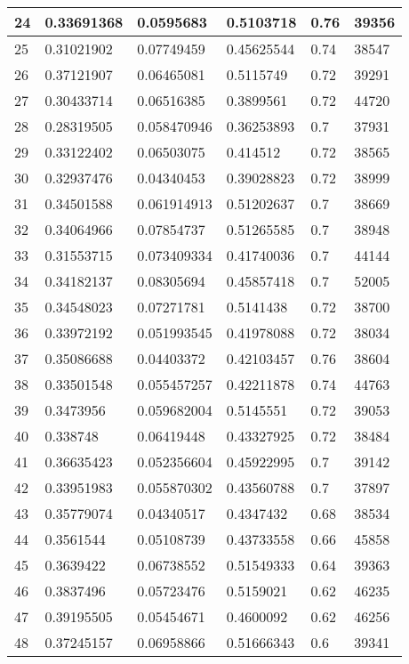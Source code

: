 \begin{longtable}{|l|l|l|l|l|l|}
24 & 0.33691368 & 0.0595683 & 0.5103718 & 0.76 & 39356 \\ \hline 
25 & 0.31021902 & 0.07749459 & 0.45625544 & 0.74 & 38547 \\ \hline 
26 & 0.37121907 & 0.06465081 & 0.5115749 & 0.72 & 39291 \\ \hline 
27 & 0.30433714 & 0.06516385 & 0.3899561 & 0.72 & 44720 \\ \hline 
28 & 0.28319505 & 0.058470946 & 0.36253893 & 0.7 & 37931 \\ \hline 
29 & 0.33122402 & 0.06503075 & 0.414512 & 0.72 & 38565 \\ \hline 
30 & 0.32937476 & 0.04340453 & 0.39028823 & 0.72 & 38999 \\ \hline 
31 & 0.34501588 & 0.061914913 & 0.51202637 & 0.7 & 38669 \\ \hline 
32 & 0.34064966 & 0.07854737 & 0.51265585 & 0.7 & 38948 \\ \hline 
33 & 0.31553715 & 0.073409334 & 0.41740036 & 0.7 & 44144 \\ \hline 
34 & 0.34182137 & 0.08305694 & 0.45857418 & 0.7 & 52005 \\ \hline 
35 & 0.34548023 & 0.07271781 & 0.5141438 & 0.72 & 38700 \\ \hline 
36 & 0.33972192 & 0.051993545 & 0.41978088 & 0.72 & 38034 \\ \hline 
37 & 0.35086688 & 0.04403372 & 0.42103457 & 0.76 & 38604 \\ \hline 
38 & 0.33501548 & 0.055457257 & 0.42211878 & 0.74 & 44763 \\ \hline 
39 & 0.3473956 & 0.059682004 & 0.5145551 & 0.72 & 39053 \\ \hline 
40 & 0.338748 & 0.06419448 & 0.43327925 & 0.72 & 38484 \\ \hline 
41 & 0.36635423 & 0.052356604 & 0.45922995 & 0.7 & 39142 \\ \hline 
42 & 0.33951983 & 0.055870302 & 0.43560788 & 0.7 & 37897 \\ \hline 
43 & 0.35779074 & 0.04340517 & 0.4347432 & 0.68 & 38534 \\ \hline 
44 & 0.3561544 & 0.05108739 & 0.43733558 & 0.66 & 45858 \\ \hline 
45 & 0.3639422 & 0.06738552 & 0.51549333 & 0.64 & 39363 \\ \hline 
46 & 0.3837496 & 0.05723476 & 0.5159021 & 0.62 & 46235 \\ \hline 
47 & 0.39195505 & 0.05454671 & 0.4600092 & 0.62 & 46256 \\ \hline 
48 & 0.37245157 & 0.06958866 & 0.51666343 & 0.6 & 39341 \\ \hline 

\end{longtable}
